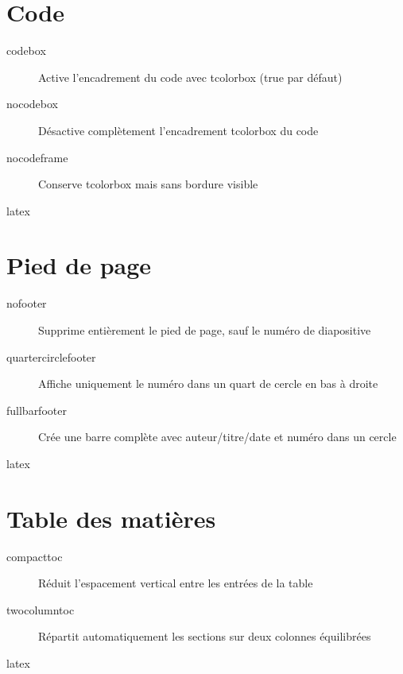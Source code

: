 \documentclass[french]{neoschool}
\begin{document}
\section{Code}
\begin{description}
\item[codebox] Active l'encadrement du code avec \textcolor{titleColor}{tcolorbox} (\textcolor{titleColor}{true} par défaut)
\item[nocodebox] Désactive complètement l'encadrement \textcolor{titleColor}{tcolorbox} du code
\item[nocodeframe] Conserve \textcolor{titleColor}{tcolorbox} mais sans bordure visible
\end{description}

\begin{code}{latex}
\end{code}

\section{Pied de page}
\begin{description}
\item[nofooter] Supprime entièrement le pied de page, sauf le numéro de diapositive
\item[quartercirclefooter] Affiche uniquement le numéro dans un quart de cercle en bas à droite
\item[fullbarfooter] Crée une barre complète avec auteur/titre/date et numéro dans un cercle
\end{description}

\begin{code}{latex}
\end{code}

\section{Table des matières}
\begin{description}
\item[compacttoc] Réduit l'espacement vertical entre les entrées de la table
\item[twocolumntoc] Répartit automatiquement les sections sur deux colonnes équilibrées
\end{description}

\begin{code}{latex}
\end{code}
\end{document}
